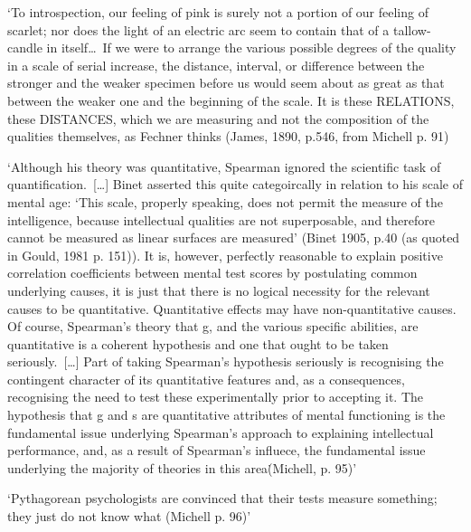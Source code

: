 \documentclass[utf8]{FrontiersinVancouver}
\begin{document}
    `To introspection, our feeling of pink is surely not a portion of our feeling of scarlet; nor does the light of an electric arc seem to contain that of a tallow-candle in itself\ldots\ If we were to arrange the various possible degrees of the quality in a scale of serial increase, the distance, interval, or difference between the stronger and the weaker specimen before us would seem about as great as that between the weaker one and the beginning of the scale. It is these RELATIONS, these DISTANCES, which we are measuring and not the composition of the qualities themselves, as Fechner thinks (James, 1890, p.546, from Michell p. 91)

    `Although his theory was quantitative, Spearman ignored the scientific task of quantification.\ [\ldots] Binet asserted this quite categoircally in relation to his scale of mental age: `This scale, properly speaking, does not permit the measure of the intelligence, because intellectual qualities are not superposable, and therefore cannot be measured as linear surfaces are measured' (Binet 1905, p.40 (as quoted in Gould, 1981 p. 151)). It is, however, perfectly reasonable to explain positive correlation coefficients between mental test scores by postulating common underlying causes, it is just that there is no logical necessity for the relevant causes to be quantitative. Quantitative effects may have non-quantitative causes. Of course, Spearman's theory that g, and the various specific abilities, are quantitative is a coherent hypothesis and one that ought to be taken seriously.\ [\ldots] Part of taking Spearman's hypothesis seriously is recognising the contingent character of its quantitative features and, as a consequences, recognising the need to test these experimentally prior to accepting it. The hypothesis that g and s are quantitative attributes of mental functioning is the fundamental issue underlying Spearman's approach to explaining intellectual performance, and, as a result of Spearman's influece, the fundamental issue underlying the majority of theories in this area\. (Michell, p. 95)'

    `Pythagorean psychologists are convinced that their tests measure something; they just do not know what (Michell p. 96)'
\end{document}
